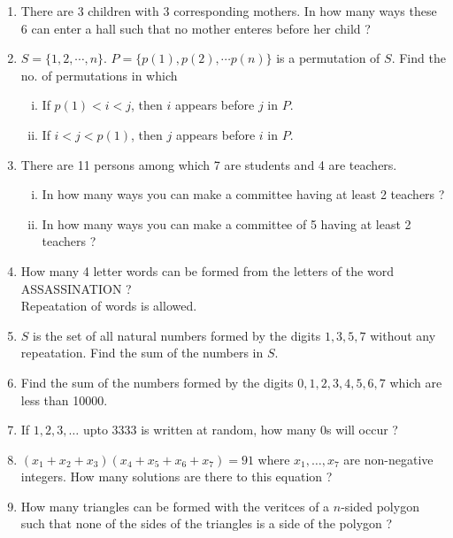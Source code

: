 \documentclass[11pt, a4paper]{article}
\begin{document}
\begin{enumerate}
	\item There are 3 children with 3 corresponding mothers. In how many ways these 6 can enter a hall such that no mother enteres before her child ?
	
	\item $S = \{1, 2, \cdots, n \}$. $P = \{ p(1), p(2), \cdots p(n) \}$ is a permutation of $S$. Find the no. of permutations in which
		\begin{enumerate}[(i)]
		\item If $p(1) < i < j$, then $i$ appears before $j$ in $P$.
		\item If $i < j < p(1)$, then $j$ appears before $i$ in $P$.		
		\end{enumerate}
		
	\item There are 11 persons among which 7 are students and 4 are teachers.
		\begin{enumerate}[(i)]
			\item In how many ways you can make a committee having at least 2 teachers ?
			\item In how many ways you can make a committee of 5 having at least 2 teachers ?		
		\end{enumerate}
		
	\item How many 4 letter words can be formed from the letters of the word  ASSASSINATION ? \\ Repeatation of words is allowed.
	
	\item $S$ is the set of all natural numbers formed by the digits $1, 3, 5, 7$ without any repeatation. Find the sum of the numbers in $S$.
	
	\item Find the sum of the numbers formed by the digits $0, 1, 2, 3, 4, 5, 6, 7$ which are less than 10000.
	
	\item If $1, 2, 3, \ldots$ upto $3333$ is written at random, how many 0s will occur ?
	
	\item $(x_1 + x_2 + x_3)(x_4 + x_5 + x_6 + x_7) = 91$ where $x_1, \ldots, x_7$ are non-negative integers. How many solutions are there to this equation ?
	
	\item How many triangles can be formed with the veritces of a $n$-sided polygon such that none of the sides of the triangles is a side of the polygon ?
	

\end{enumerate}
\end{document}
